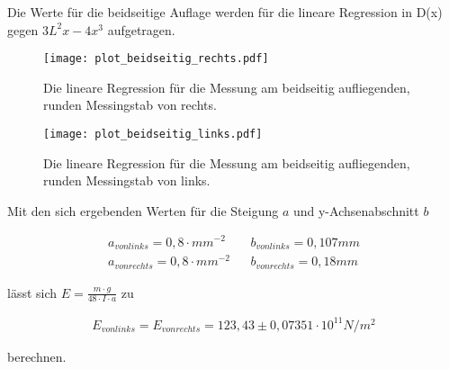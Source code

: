 Die Werte für die beidseitige Auflage werden für die lineare Regression in D(x) gegen $3L^2 x - 4x^3$ aufgetragen.



\begin{figure}
  \centering
  \texttt{[image: plot\_beidseitig\_rechts.pdf]}
  \caption{Die lineare Regression für die Messung am beidseitig aufliegenden, runden Messingstab von rechts.}
  \label{fig:plot_beidseitig_rechts}
\end{figure} 

\begin{figure}
  \centering
  \texttt{[image: plot\_beidseitig\_links.pdf]}
  \caption{Die lineare Regression für die Messung am beidseitig aufliegenden, runden Messingstab von links.}
  \label{fig:plot_beidseitig_links}
\end{figure}      

Mit den sich ergebenden Werten für die Steigung $a$ und y-Achsenabschnitt $b$

\begin{align*}
  a_{von links} = 0,8 \cdot mm^{-2} && b_{von links} = 0,107 mm \\
  a_{von rechts} = 0,8 \cdot mm^{-2} && b_{von rechts} = 0,18 mm
\end{align*}

lässt sich $E = \frac{m \cdot g}{48 \cdot I \cdot a}$ zu

\begin{align*}
  E_{von links} = E_{von rechts} = 123,43 \pm 0,07351 \cdot 10^{11} N/m^2 
\end{align*}

berechnen.
